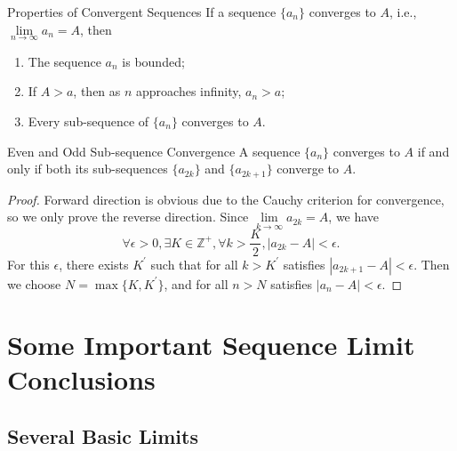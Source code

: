 \begin{proposition}{Properties of Convergent Sequences}{}
  If a sequence $\{a_n\}$ converges to $A$, i.e.,
  $\lim \limits _{n \rightarrow \infty} a_n = A$, then
  \begin{enumerate}
  \item The sequence $a_n$ is bounded;
  \item If $A > a$, then as $n$ approaches infinity, $a_n > a$;
  \item Every sub-sequence of $\{a_n\}$ converges to $A$.
  \end{enumerate}
\end{proposition}

\begin{theorem}{Even and Odd Sub-sequence Convergence}{}
  A sequence $\{a_n\}$ converges to $A$ if and only if both its sub-sequences
  $\{a_{2k}\}$ and $\{a_{2k+1}\}$ converge to $A$.
\end{theorem}

\begin{proof}
  Forward direction is obvious due to the Cauchy criterion for convergence,
  so we only prove the reverse direction.
  Since $\lim \limits _{k \rightarrow \infty} a_{2k} = A$, we have
  \begin{equation}
    \forall \epsilon > 0, \exists K \in \mathbb{Z}^+, \forall k > \frac{K}{2}, |a_{2k} - A| < \epsilon.
  \end{equation}
  For this $\epsilon$, there exists $K^{\prime}$ such that for all $k >
  K^{\prime}$ satisfies $|a_{2k + 1} - A| < \epsilon$.
  Then we choose $N = \max \{K, K^{\prime}\}$, and for all $n > N$ satisfies
  $|a_n - A| < \epsilon$.
\end{proof}

\section{Some Important Sequence Limit Conclusions}

\subsection{Several Basic Limits}

